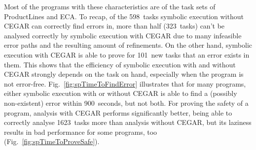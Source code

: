 Most of the programs with these characteristics are of the task sets of ProductLines and ECA.
To recap, of the 598~tasks symbolic execution without CEGAR can correctly find errors in, more than half (323~tasks) can't be analysed correctly by symbolic execution with CEGAR
due to many infeasible error paths and the resulting amount of refinements.
On the other hand, symbolic execution with CEGAR is able to prove for 101~new tasks that an error exists in them.
This shows that the efficiency of symbolic execution with and without CEGAR strongly depends on the task on hand, especially when the program is not error-free.
Fig.~\ref{fig:spTimeToFindError} illustrates that for many programs, either symbolic execution with or without CEGAR is able to find a (possibly non-existent) error within 900~seconds, but not both.
For proving the safety of a program, analysis with CEGAR performs significantly better, being able to correctly analyse 1623~tasks more than analysis without CEGAR, but its laziness results in bad performance for some programs, too (Fig.~\ref{fig:spTimeToProveSafe}).

